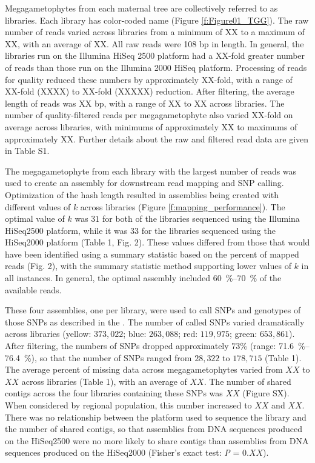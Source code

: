 \documentclass[11pt]{article}
\begin{document}
Megagametophytes from each maternal tree are 
collectively referred to as libraries. Each library has color-coded name (Figure \ref{f:Figure01_TGG}).
The raw number of reads varied across libraries from a minimum of
XX to a maximum of XX, with an average of XX. All raw reads were 108 bp in length. In 
general, the libraries run on the Illumina HiSeq 2500 platform had a XX-fold greater 
number of reads than those run on the 
Illumina 2000 HiSeq platform. Processing of reads for quality reduced these numbers by 
approximately XX-fold, with a range 
of XX-fold (XXXX) to XX-fold (XXXXX) reduction. After filtering, the average
length of reads was XX bp, with a range of XX to XX across libraries. 
The number of quality-filtered reads per megagametophyte also varied XX-fold on average 
across libraries, with minimums of approximately XX to maximums of approximately XX. 
Further details about the raw and filtered read data are given in Table S1.

The megagametophyte from each library with the largest number of reads
was used to create an assembly for downstream read mapping and SNP calling.
Optimization of the hash length resulted in assemblies being created with different values of 
$k$ across libraries (Figure \ref{f:mapping_performance}). The optimal value of $k$ was $31$ for 
both of the libraries sequenced using the Illumina HiSeq2500 platform, while it was $33$ for the
libraries sequenced using the HiSeq2000 platform (Table 1, Fig. 2). These values differed from those that would
have been identified using a summary statistic based on the percent of mapped reads (Fig. 2), with the
summary statistic method supporting lower values of $k$ in all instances. In general, the optimal assembly
included \SIrange{60}{70}{\%} of the available reads. 

These four assemblies, one per library, were used to call SNPs and genotypes of those SNPs as described in the . 
The number of called SNPs varied dramatically across libraries (yellow: $373,022$; blue: $263,088$; red: $119,975$; green: $653,861$). 
After filtering, the numbers of SNPs dropped approximately $73$\% (range: \SIrange{71.6}{76.4}{\%}), so that the number of SNPs
ranged from $28,322$ to $178,715$ (Table 1). The average percent of missing data across megagametophytes 
varied from $XX$ to $XX$ across libraries (Table 1), with an average of $XX$. The number of shared contigs across the four 
libraries containing these SNPs was $XX$ (Figure SX). When considered by regional population, this number increased to $XX$ and $XX$.
There was no relationship between the platform used to sequence the library and the number of shared contigs, 
so that assemblies from DNA sequences produced on the HiSeq2500 were no more likely to share contigs than assemblies 
from DNA sequences produced on the HiSeq2000 (Fisher's exact test: \textit{P} = $0.XX$). 
\end{document}
